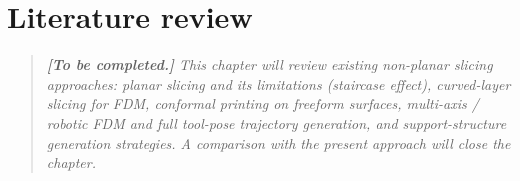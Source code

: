 \section{Literature review}\label{sec:literature}


\begin{quote}
\itshape
\textbf{[To be completed.]} This chapter will review existing non-planar
slicing approaches: planar slicing and its limitations (staircase
effect), curved-layer slicing for FDM, conformal printing on
freeform surfaces, multi-axis / robotic FDM and full tool-pose
trajectory generation, and support-structure generation strategies.
A comparison with the present approach will close the chapter.
\end{quote}
